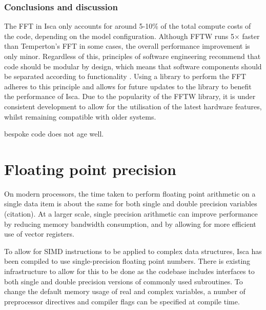 \documentclass[a4paper,11pt]{report}
\begin{document}
\subsubsection{Conclusions and discussion}
The FFT in Isca only accounts for around 5-10\% of the total compute costs of the code, depending on the model configuration. Although FFTW runs 5$\times$ faster than Temperton's FFT in some cases, the overall performance improvement is only minor. Regardless of this, principles of software engineering recommend that code should be modular by design, which means that software components should be separated according to functionality \cite{parnas1972criteria}. Using a library to perform the FFT adheres to this principle and allows for future updates to the library to benefit the performance of Isca. Due to the popularity of the FFTW library, it is under consistent development to allow for the utilisation of the latest hardware features, whilst remaining compatible with older systems. 
\par
bespoke code does not age well. 


%
%
%

















\section{Floating point precision}
\label{sec:floating-pont}
On modern processors, the time taken to perform floating point arithmetic on a single data item is about the same for both single and double precision variables (citation). At a larger scale, single precision arithmetic can improve performance by reducing memory bandwidth consumption, and by allowing for more efficient use of vector registers.
\par
To allow for SIMD instructions to be applied to complex data structures, Isca has been compiled to use single-precision floating point numbers. There is existing infrastructure to allow for this to be done as the codebase includes interfaces to both single and double precision versions of commonly used subroutines. To change the default memory usage of real and complex variables, a number of preprocessor directives and compiler flags can be specified at compile time. 
\end{document}
